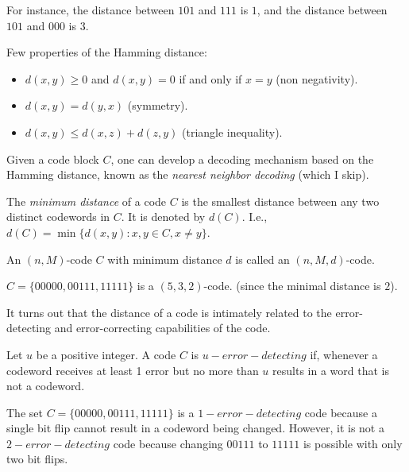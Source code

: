 For instance, the distance between $101$ and $111$ is $1$, 
and the distance between $101$ and $000$ is $3$.

Few properties of the Hamming distance:
\begin{itemize}
    \item $d(x,y)\ge0$ and $d(x,y)=0$ if and only if $x=y$ (non negativity).
    \item $d(x,y)=d(y,x)$ (symmetry).
    \item $d(x,y)\le d(x,z)+d(z,y)$ (triangle inequality).
\end{itemize}

Given a code block $C$, one can develop a decoding mechanism
based on the Hamming distance, known as the \emph{nearest neighbor decoding} (which I skip).


\begin{definition}
    The \emph{minimum distance} of a code $C$ is the smallest distance 
    between any two distinct codewords in $C$.
    It is denoted by $d(C)$.
    I.e., $d(C) = \min\{d(x,y): x,y\in C, x\neq y\}$.
\end{definition}

\begin{definition}
    An $(n,M)$-code $C$ with minimum distance $d$ is called an $(n,M,d)$-code.
\end{definition}


\begin{example}
    $C=\{00000, 00111, 11111\}$ is a $(5,3,2)$-code. (since the minimal distance is $2$).
\end{example}


It turns out that the distance of a code is intimately related to the error-
detecting and error-correcting capabilities of the code.

\begin{definition}
Let $u$ be a positive integer. A code $C$ is $u-error-detecting$ 
if, whenever a codeword receives at least 1 error but no more than $u$ results
in a word that is not a codeword.
\end{definition}

\begin{example}
    The set $C=\{00000, 00111, 11111\}$ is a $1-error-detecting$ code
     because a single bit flip
    cannot result in a codeword being changed. 
    However, it is not a $2-error-detecting$ code because changing
     $00111$ to $11111$ is possible with 
    only two bit flips.
\end{example}

